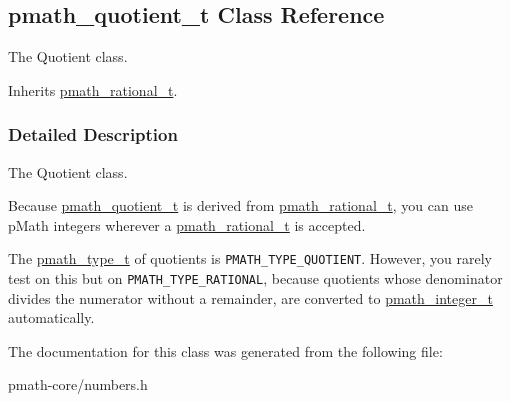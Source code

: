\hypertarget{classpmath__quotient__t}{
\subsection{pmath\_\-quotient\_\-t Class Reference}
\label{classpmath__quotient__t}
}
The Quotient class.  


Inherits \hyperlink{classpmath__rational__t}{pmath\_\-rational\_\-t}.



\subsubsection{Detailed Description}
The Quotient class. 

Because \hyperlink{classpmath__quotient__t}{pmath\_\-quotient\_\-t} is derived from \hyperlink{classpmath__rational__t}{pmath\_\-rational\_\-t}, you can use pMath integers wherever a \hyperlink{classpmath__rational__t}{pmath\_\-rational\_\-t} is accepted.

The \hyperlink{group__objects_ge2646df76dcb0113715322b13a1f36f0}{pmath\_\-type\_\-t} of quotients is {\tt PMATH\_\-TYPE\_\-QUOTIENT}. However, you rarely test on this but on {\tt PMATH\_\-TYPE\_\-RATIONAL}, because quotients whose denominator divides the numerator without a remainder, are converted to \hyperlink{classpmath__integer__t}{pmath\_\-integer\_\-t} automatically. 

The documentation for this class was generated from the following file:\begin{CompactItemize}
\item 
pmath-core/numbers.h\end{CompactItemize}

